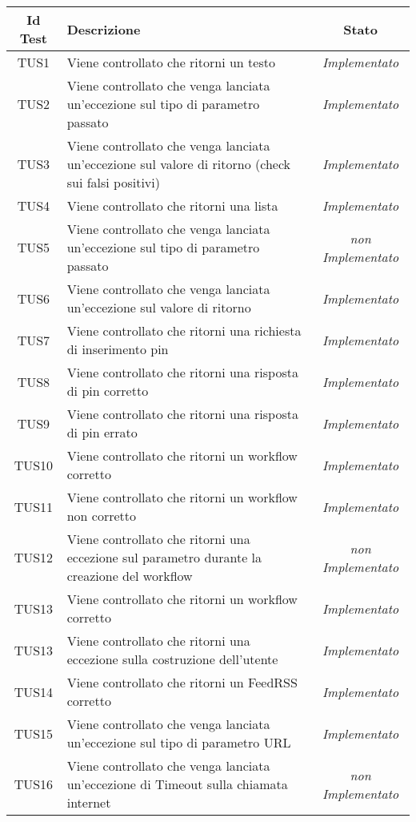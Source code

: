 \normalsize
\begin{longtable}{|c|m{12em}|c|}
\hline 
\textbf{Id Test} & \textbf{Descrizione} & \textbf{Stato}\\
\hline
\endhead
TUS1 & Viene controllato che ritorni un testo & \textit{Implementato}\\ \hline
TUS2 & Viene controllato che venga lanciata un'eccezione sul tipo di parametro passato & \textit{Implementato}\\ \hline
TUS3 & Viene controllato che venga lanciata un'eccezione sul valore di ritorno (check sui falsi positivi)  & \textit{Implementato}\\ \hline
TUS4 & Viene controllato che ritorni una lista & \textit{Implementato}\\ \hline
TUS5 & Viene controllato che venga lanciata un'eccezione sul tipo di parametro passato & \textit{non Implementato}\\ \hline
TUS6 & Viene controllato che venga lanciata un'eccezione sul valore di ritorno & \textit{Implementato}\\ \hline
TUS7 & Viene controllato che ritorni una richiesta di inserimento pin & \textit{Implementato}\\ \hline
TUS8 & Viene controllato che ritorni una risposta di pin corretto & \textit{Implementato}\\ \hline
TUS9 & Viene controllato che ritorni una risposta di pin errato & \textit{Implementato}\\ \hline
TUS10 & Viene controllato che ritorni un workflow corretto & \textit{Implementato}\\ \hline
TUS11 & Viene controllato che ritorni un workflow non corretto & \textit{Implementato}\\ \hline
TUS12 & Viene controllato che ritorni una eccezione sul parametro durante la creazione del workflow & \textit{non Implementato}\\ \hline
TUS13 & Viene controllato che ritorni un workflow corretto & \textit{Implementato}\\ \hline
TUS13 & Viene controllato che ritorni una eccezione sulla costruzione dell'utente & \textit{Implementato}\\ \hline
TUS14 & Viene controllato che ritorni un FeedRSS corretto & \textit{Implementato}\\ \hline
TUS15 & Viene controllato che venga lanciata un'eccezione sul tipo di parametro URL & \textit{Implementato}\\ \hline
TUS16 & Viene controllato che venga lanciata un'eccezione di Timeout sulla chiamata internet & \textit{non Implementato}\\ \hline

\end{longtable}
